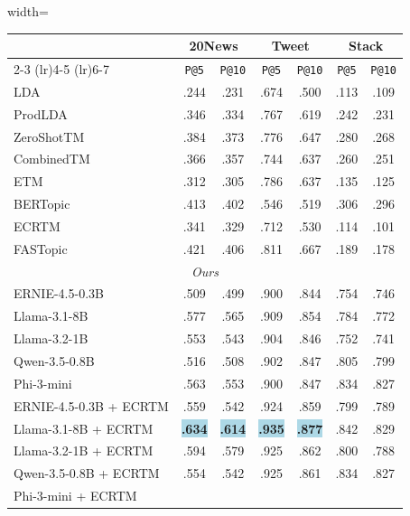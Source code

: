 \begin{table}[t]%
\centering
\begin{adjustbox}{width=\linewidth}
\begin{tabular}{l *{6}{c}}
\toprule
\multicolumn{1}{c}{} &
  \multicolumn{2}{c}{\large \textbf{20News}} &
  \multicolumn{2}{c}{\large \textbf{Tweet}} &
  \multicolumn{2}{c}{\large \textbf{Stack}} \\
\cmidrule(lr){2-3} \cmidrule(lr){4-5} \cmidrule(lr){6-7}
\multicolumn{1}{c}{} &
  \texttt{\small P@5} &
  \texttt{\small P@10} &
  \texttt{\small P@5} &
  \texttt{\small P@10} &
  \texttt{\small P@5} &
  \texttt{\small P@10} \\
\midrule
LDA &
.244 & .231 & .674 & .500 & .113 & .109 \\
ProdLDA &
.346 & .334 & .767 & .619 & .242 & .231 \\
ZeroShotTM &
.384 & .373 & .776 & .647 & .280 & .268 \\
CombinedTM &
.366 & .357 & .744 & .637 & .260 & .251 \\
ETM &
.312 & .305 & .786 & .637 & .135 & .125 \\
BERTopic &
.413 & .402 & .546 & .519 & .306 & .296 \\
ECRTM &
.341 & .329 & .712 & .530 & .114 & .101 \\
FASTopic &
.421 & .406 & .811 & .667 & .189 & .178 \\
\midrule
\multicolumn{7}{c}{\large \textit{Ours}} \\
\midrule
ERNIE-4.5-0.3B &
.509 & .499 & .900 & .844 & .754 & .746 \\
Llama-3.1-8B &
.577 & .565 & .909 & .854 & .784 & .772 \\
Llama-3.2-1B &
.553 & .543 & .904 & .846 & .752 & .741 \\
Qwen-3.5-0.8B &
.516 & .508 & .902 & .847 & .805 & .799 \\
Phi-3-mini &
.563 & .553 & .900 & .847 & .834 & .827 \\
ERNIE-4.5-0.3B + ECRTM &
.559 & .542 & .924 & .859 & .799 & .789 \\
Llama-3.1-8B + ECRTM &
\colorbox{lightblue}{\textbf{.634}} & \colorbox{lightblue}{\textbf{.614}} & \colorbox{lightblue}{\textbf{.935}} & \colorbox{lightblue}{\textbf{.877}} & .842 & .829 \\
Llama-3.2-1B + ECRTM &
.594 & .579 & .925 & .862 & .800 & .788 \\
Qwen-3.5-0.8B + ECRTM &
.554 & .542 & .925 & .861 & .834 & .827 \\
Phi-3-mini + ECRTM &

\end{tabular}
\end{adjustbox}
\end{table}
